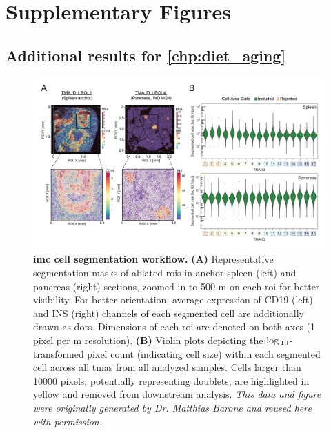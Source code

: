 
\chapter{Supplementary Figures}
\label{chp:app_figures}

\clearpage





\section[\autoref{chp:diet_aging}]{Additional results for \autoref{chp:diet_aging}}

\begin{figure}[H]
    \centering
    \vspace{-30pt}
    \includegraphics[width=\linewidth]{Appendix2/Fig/F2-A4-01.png}
    \caption[ cell segmentation workflow]{\textbf{\gls{imc} cell segmentation workflow.} \textbf{(A)} Representative segmentation masks of ablated \glspl{roi} in anchor spleen (left) and pancreas (right) sections, zoomed in to 500 \textmu m on each \gls{roi} for better visibility. For better orientation, average expression of CD19 (left) and INS (right) channels of each segmented cell are additionally drawn as dots. Dimensions of each \gls{roi} are denoted on both axes (1 pixel per \textmu m resolution). \textbf{(B)} Violin plots depicting the $\log\textsubscript{10}$-transformed pixel count (indicating cell size) within each segmented cell across all \glspl{tma} from all analyzed samples. Cells larger than 10000 pixels, potentially representing doublets, are highlighted in yellow and removed from downstream analysis. \textit{This data and figure were originally generated by Dr. Matthias Barone and reused here with permission.}}
    \label{fig:app_imc_segmentation}
\end{figure}


